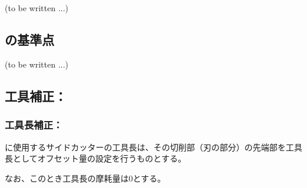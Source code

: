 \subsection{\CurvedOutcut\TBW}
(to be written ...)


\clearpage


\subsection{\KeywayMilling の基準点\TBW}
(to be written ...)


\subsection{工具補正：\KeywayMilling}


\subsubsection{工具長補正：\KeywayMilling}
\KeywayMilling に使用するサイドカッターの工具長は、その切削部（刃の部分）の先端部を工具長としてオフセット量の設定を行うものとする。

なお、このとき工具長の摩耗量は0とする。


